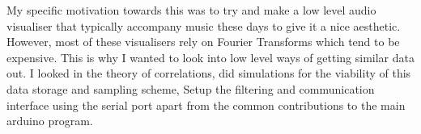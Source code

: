 My specific motivation towards this was to try and make a low level audio visualiser that typically accompany music these days to give it a nice aesthetic. However, most of these visualisers rely on Fourier Transforms which tend to be expensive. This is why I wanted to look into low level ways of getting similar data out.  I looked in the theory of correlations, did simulations for the viability of this data storage and sampling scheme, Setup the filtering and communication interface using the serial port apart from the common contributions to the main arduino program.   